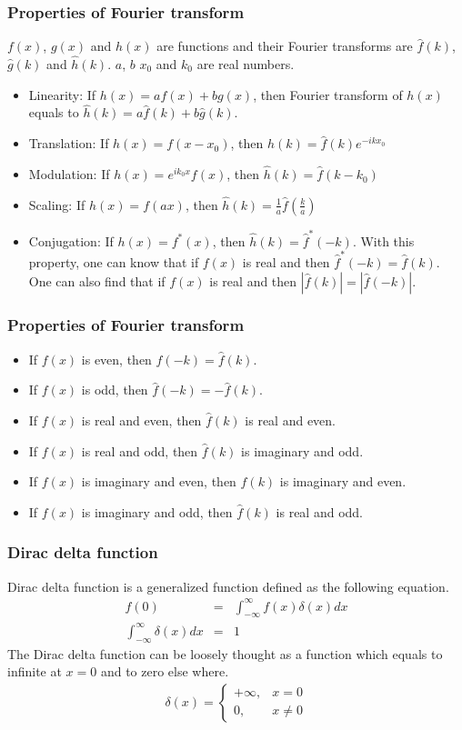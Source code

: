 \documentclass{beamer}
\begin{document}
\begin{frame}
\frametitle{Properties of Fourier transform}
$f(x)$, $g(x)$ and $h(x)$ are functions and  their Fourier transforms are $\hat{f}(k)$, $\hat{g}(k)$ and $\hat{h}(k)$. $a$, $b$ $x_0$ and $k_0$ are real numbers.
\begin{itemize}
\item Linearity: If $h(x) = af(x)+bg(x)$, then Fourier transform of $h(x)$ equals to $\hat{h}(k) = a\hat{f}(k)+b\hat{g}(k)$.
\item Translation: If $h(x) = f(x-x_0)$, then $\hat{h}(k) = \hat{f}(k)e^{-ikx_0}$
\item Modulation: If $h(x) = e^{ik_0x}f(x)$, then $\hat{h}(k) = \hat{f}(k-k_0)$
\item Scaling: If $h(x) = f(ax)$, then $\hat{h}(k) = \frac{1}{a}\hat{f}(\frac{k}{a})$
\item Conjugation: If $h(x) = f^*(x)$, then $\hat{h}(k) = \hat{f}^*(-k)$. With this property, one can know that if $f(x)$ is real and then $\hat{f}^*(-k) = \hat{f}(k)$. One can also find that if $f(x)$ is real and then $|\hat{f}(k)| = |\hat{f}(-k)|$.
\end{itemize}
\end{frame}
\begin{frame}
\frametitle{Properties of Fourier transform}
\begin{itemize}
\item If $f(x)$ is even, then $\hat{f}(-k) = \hat{f}(k)$.
\item If $f(x)$ is odd, then $\hat{f}(-k) = -\hat{f}(k)$.
\item If $f(x)$ is real and even, then $\hat{f}(k)$ is real and even.
\item If $f(x)$ is real and odd, then $\hat{f}(k)$ is imaginary and odd.
\item If $f(x)$ is imaginary and even, then $\hat{f}(k)$ is imaginary and even.
\item If $f(x)$ is imaginary and odd, then $\hat{f}(k)$ is real and odd.
\end{itemize}
\end{frame}
\begin{frame}
\frametitle{Dirac delta function}
Dirac delta function is a generalized function defined as the following equation.
\begin{eqnarray}
f(0) &=&\int_{-\infty}^{\infty} f(x)\delta{(x)} dx \nonumber \\
\int_{-\infty}^{\infty}\delta{(x)} dx &=& 1
\label{eq:dirac_delta}
\end{eqnarray}
The Dirac delta function can be loosely thought as a function which equals to infinite at $x = 0$ and to zero else where.
\begin{eqnarray}
\delta(x) = \begin{cases} +\infty, & x = 0 \\ 0, & x \ne 0 \end{cases} \nonumber
\end{eqnarray}
\end{frame}
\end{document}
